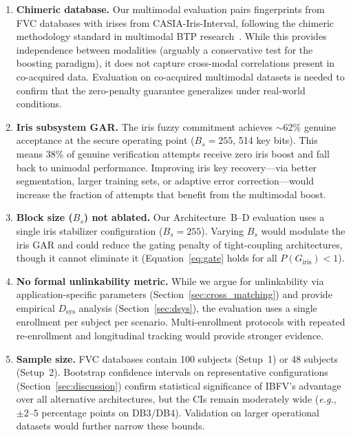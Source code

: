 \documentclass[3p,twocolumn]{elsarticle}
\newcommand{\IBFV}{\textsf{IBFV}}
\newcommand{\eg}{\textit{e.g.}}
\begin{document}
\begin{enumerate}
    \item \textbf{Chimeric database.} Our multimodal evaluation pairs fingerprints from FVC databases with irises from CASIA-Iris-Interval, following the chimeric methodology standard in multimodal BTP research~\cite{ross2003information,nandakumar2008multibiometric}. While this provides independence between modalities (arguably a conservative test for the boosting paradigm), it does not capture cross-modal correlations present in co-acquired data. Evaluation on co-acquired multimodal datasets is needed to confirm that the zero-penalty guarantee generalizes under real-world conditions.
    \item \textbf{Iris subsystem GAR.} The iris fuzzy commitment achieves $\sim$62\% genuine acceptance at the secure operating point ($B_s = 255$, 514 key bits). This means 38\% of genuine verification attempts receive zero iris boost and fall back to unimodal performance. Improving iris key recovery---via better segmentation, larger training sets, or adaptive error correction---would increase the fraction of attempts that benefit from the multimodal boost.
    \item \textbf{Block size ($B_s$) not ablated.} Our Architecture~B--D evaluation uses a single iris stabilizer configuration ($B_s = 255$). Varying $B_s$ would modulate the iris GAR and could reduce the gating penalty of tight-coupling architectures, though it cannot eliminate it (Equation~\ref{eq:gate} holds for all $P(G_{\text{iris}}) < 1$).
    \item \textbf{No formal unlinkability metric.} While we argue for unlinkability via application-specific parameters (Section~\ref{sec:cross_matching}) and provide empirical $D_{\text{sys}}$ analysis (Section~\ref{sec:dsys}), the evaluation uses a single enrollment per subject per scenario. Multi-enrollment protocols with repeated re-enrollment and longitudinal tracking would provide stronger evidence.
    \item \textbf{Sample size.} FVC databases contain 100 subjects (Setup~1) or 48 subjects (Setup~2). Bootstrap confidence intervals on representative configurations (Section~\ref{sec:discussion}) confirm statistical significance of \IBFV{}'s advantage over all alternative architectures, but the CIs remain moderately wide (\eg{}, $\pm 2$--$5$ percentage points on DB3/DB4). Validation on larger operational datasets would further narrow these bounds.
\end{enumerate}
\end{document}
